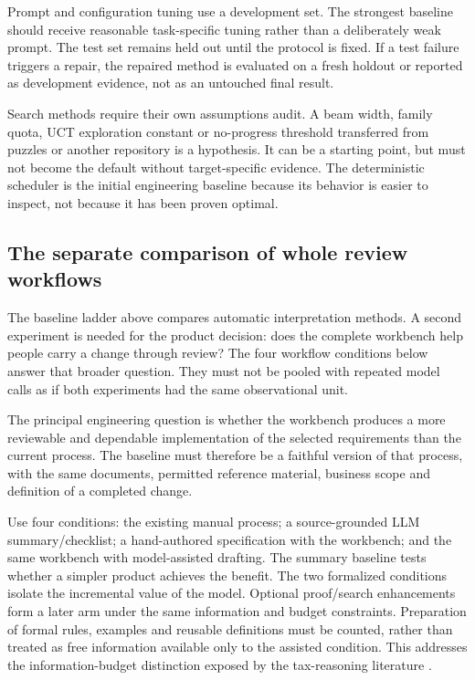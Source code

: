 Prompt and configuration tuning use a development set. The strongest baseline
should receive reasonable task-specific tuning rather than a deliberately weak
prompt. The test set remains held out until the protocol is fixed. If a test
failure triggers a repair, the repaired method is evaluated on a fresh holdout or
reported as development evidence, not as an untouched final result.

Search methods require their own assumptions audit. A beam width, family quota,
UCT exploration constant or no-progress threshold transferred from puzzles or
another repository is a hypothesis. It can be a starting point, but must not
become the default without target-specific evidence. The deterministic scheduler
is the initial engineering baseline because its behavior is easier to inspect,
not because it has been proven optimal.

\subsection{The separate comparison of whole review workflows}

The baseline ladder above compares automatic interpretation methods. A second
experiment is needed for the product decision: does the complete workbench help
people carry a change through review? The four workflow conditions below answer
that broader question. They must not be pooled with repeated model calls as if
both experiments had the same observational unit.


\label{merge:P-04-prototype:04}


The principal engineering question is whether the workbench produces a more
reviewable and dependable implementation of the selected requirements than the
current process. The baseline must therefore be a faithful version of that
process, with the same documents, permitted reference material, business scope and
definition of a completed change.

Use four conditions: the existing manual process; a source-grounded LLM
summary/checklist; a hand-authored specification with the workbench; and the same
workbench with model-assisted drafting. The summary baseline tests whether a
simpler product achieves the benefit. The two formalized conditions isolate the
incremental value of the model. Optional proof/search enhancements form a later
arm under the same information and budget constraints. Preparation of formal
rules, examples and reusable definitions must be counted, rather than treated as
free information available only to the assisted condition. This addresses the
information-budget distinction exposed by the tax-reasoning literature
\citep{jurayj2026}.

